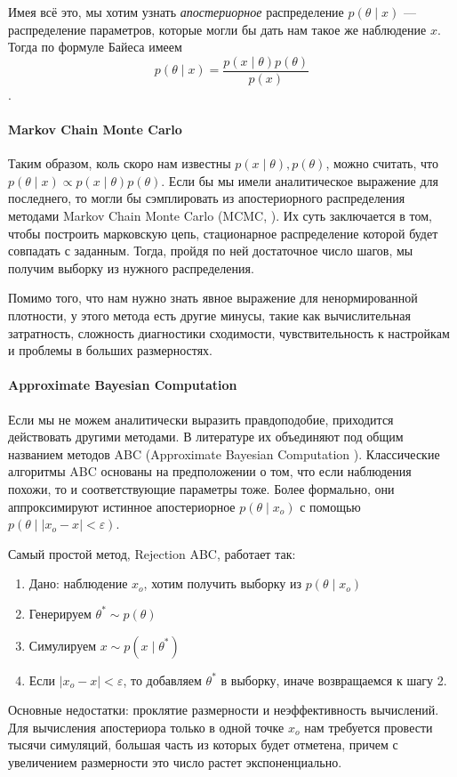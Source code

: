     Имея всё это, мы хотим узнать \textit{апостериорное} распределение $p(\theta \mid x)$ --- распределение параметров,
    которые могли бы дать нам такое же наблюдение $x$. Тогда по формуле Байеса имеем
    $$
    p(\theta \mid x) = \frac{p(x \mid \theta) p(\theta)}{p(x)}
    $$.
    
    \paragraph{\textbf{Markov Chain Monte Carlo}} Таким образом, коль скоро нам известны $p(x \mid \theta), p(\theta)$, можно считать, 
    что $p(\theta \mid x) \propto p(x \mid \theta) p(\theta)$. Если бы мы имели аналитическое выражение для последнего, 
    то могли бы сэмплировать из апостериорного распределения методами Markov Chain Monte Carlo (MCMC, \cite{Chib2004}). 
    Их суть заключается в том, чтобы построить марковскую цепь, стационарное распределение которой будет совпадать 
    с заданным. Тогда, пройдя по ней достаточное число шагов, мы получим выборку из нужного распределения.
    
    Помимо того, что нам нужно знать явное выражение для ненормированной плотности, 
    у этого метода есть другие минусы, такие как вычислительная затратность, сложность диагностики сходимости,
    чувствительность к настройкам и проблемы в больших размерностях.
    
    \paragraph{\textbf{Approximate Bayesian Computation}} Если мы не можем аналитически выразить правдоподобие,
    приходится действовать другими методами. В литературе их объединяют под общим названием методов ABC (Approximate Bayesian Computation \cite{abcinpopulationgenetics}).
    Классические алгоритмы ABC основаны на предположении о том, что если наблюдения похожи, то и соответствующие параметры тоже.
    Более формально, они аппроксимируют истинное апостериорное $p(\theta \mid x_o)$ с помощью $p(\theta \mid \lvert x_o - x \rvert < \varepsilon)$.
    
    Самый простой метод, Rejection ABC, работает так:
    \begin{enumerate}
        \item Дано: наблюдение $x_o$, хотим получить выборку из $p(\theta \mid x_o)$
        \item Генерируем $\theta^* \sim p(\theta)$
        \item Симулируем $x \sim p(x \mid \theta^*)$
        \item Если $\lvert x_o - x \rvert < \varepsilon$, то добавляем $\theta^*$ в выборку, иначе возвращаемся к шагу 2.
    \end{enumerate} 
    Основные недостатки: проклятие размерности и неэффективность вычислений.
    Для вычисления апостериора только в одной точке $x_o$ нам требуется провести тысячи симуляций, 
    большая часть из которых будет отметена, причем с увеличением размерности это число растет экспоненциально.

